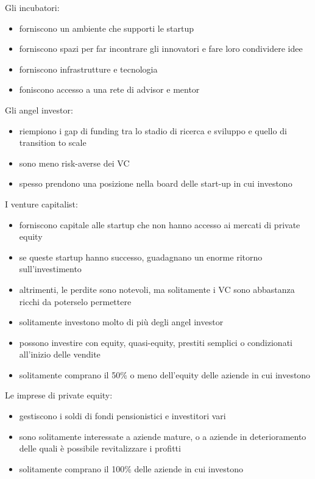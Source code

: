 \documentclass[answers, a4paper, 11pt]{exam}
\begin{document}
Gli incubatori:

\begin{itemize}
    \item forniscono un ambiente che supporti le startup
    \item forniscono spazi per far incontrare gli innovatori e fare loro condividere idee
    \item forniscono infrastrutture e tecnologia
    \item foniscono accesso a una rete di advisor e mentor
\end{itemize}

Gli angel investor:

\begin{itemize}
    \item riempiono i gap di funding tra lo stadio di ricerca e sviluppo e quello di transition to scale
    \item sono meno risk-averse dei VC
    \item spesso prendono una posizione nella board delle start-up in cui investono
\end{itemize}

I venture capitalist:

\begin{itemize}
    \item forniscono capitale alle startup che non hanno accesso ai mercati di private equity
    \item se queste startup hanno successo, guadagnano un enorme ritorno sull'investimento
    \item altrimenti, le perdite sono notevoli, ma solitamente i VC sono abbastanza ricchi da poterselo permettere
    \item solitamente investono molto di più degli angel investor
    \item possono investire con equity, quasi-equity, prestiti semplici o condizionati all'inizio delle vendite
    \item solitamente comprano il 50\% o meno dell'equity delle aziende in cui investono
\end{itemize}

Le imprese di private equity:

\begin{itemize}
    \item gestiscono i soldi di fondi pensionistici e investitori vari
    \item sono solitamente interessate a aziende mature, o a aziende in deterioramento delle quali è possibile revitalizzare i profitti
    \item solitamente comprano il 100\% delle aziende in cui investono
\end{itemize}
\end{document}
